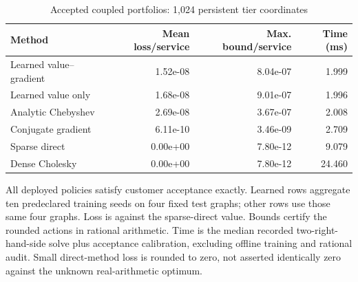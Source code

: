 \begin{table}[!ht]
\centering
\caption{Accepted coupled portfolios: 1,024 persistent tier coordinates}\label{tab:portfolio}
\begin{tabular}{lrrr}\toprule
Method & Mean loss/service & Max. bound/service & Time (ms)\\
\midrule
Learned value--gradient & 1.52e-08 & 8.04e-07 & 1.999\\
Learned value only & 1.68e-08 & 9.01e-07 & 1.996\\
Analytic Chebyshev & 2.69e-08 & 3.67e-07 & 2.008\\
Conjugate gradient & 6.11e-10 & 3.46e-09 & 2.709\\
Sparse direct & 0.00e+00 & 7.80e-12 & 9.079\\
Dense Cholesky & 0.00e+00 & 7.80e-12 & 24.460\\
\bottomrule\end{tabular}
\par\smallskip\begin{minipage}{.98\textwidth}\small All deployed policies satisfy customer acceptance exactly. Learned rows aggregate ten predeclared training seeds on four fixed test graphs; other rows use those same four graphs. Loss is against the sparse-direct value. Bounds certify the rounded actions in rational arithmetic. Time is the median recorded two-right-hand-side solve plus acceptance calibration, excluding offline training and rational audit. Small direct-method loss is rounded to zero, not asserted identically zero against the unknown real-arithmetic optimum.\end{minipage}
\end{table}
